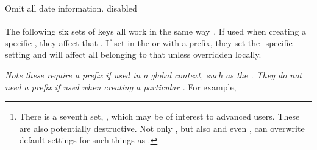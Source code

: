 \documentclass[10pt,british,a4paper]{ltxdoc}
\begin{document}
\hypertarget{key:life/only-text}{}\hypertarget{key:period/only-text}{}\hypertarget{key:event/only-text}{}Omit all date information. \AfterLastParam
\Default*{}disabled

The following six sets of keys all work in the same way\footnote{%
  There is a seventh set, , which may be of interest to advanced users.
  These \keyslabelname{} are also potentially destructive.
  Not only , but also  and even , can overwrite default settings for such things as .}.
If used when creating a specific \elementlabelname{}, they affect that \elementlabelname{}.
If set in the  or  with a  prefix, they set the -specific setting and will affect all \elementslabelname{} belonging to that \taglabelname{} unless overridden locally.

\emph{Note these \keyslabelname{} \emph{require} a \conceptname[type=concept,idx as=tag,idx post=prefix required]{\taglabelname} prefix if used in a global context, such as the .
  They do \emph{not} need a prefix if used when creating a particular \elementlabelname{}.}
For example,
\begin{chronoscode}
\begin{chronos}
  [
    event/line+={semithick},%
  ]
\end{chronos}
\end{chronoscode}
\end{document}
